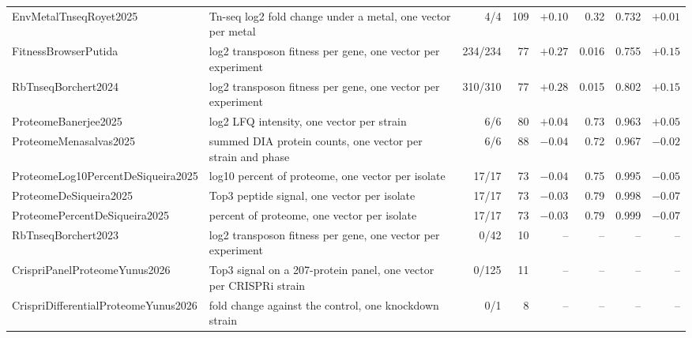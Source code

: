 \begin{longtable}{@{}L{40mm} L{54mm} r r r r r r@{}}
Env\allowbreak Metal\allowbreak Tnseq\allowbreak Royet2025 & Tn-seq log2 fold change under a metal, one vector per metal & 4/4 & 109 & $+0.10$ & 0.32 & 0.732 & $+0.01$ \\
Fitness\allowbreak Browser\allowbreak Putida & log2 transposon fitness per gene, one vector per experiment & 234/234 & 77 & $+0.27$ & 0.016 & 0.755 & $+0.15$ \\
Rb\allowbreak Tnseq\allowbreak Borchert2024 & log2 transposon fitness per gene, one vector per experiment & 310/310 & 77 & $+0.28$ & 0.015 & 0.802 & $+0.15$ \\
Proteome\allowbreak Banerjee2025 & log2 LFQ intensity, one vector per strain & 6/6 & 80 & $+0.04$ & 0.73 & 0.963 & $+0.05$ \\
Proteome\allowbreak Menasalvas2025 & summed DIA protein counts, one vector per strain and phase & 6/6 & 88 & $-0.04$ & 0.72 & 0.967 & $-0.02$ \\
Proteome\allowbreak Log10\allowbreak Percent\allowbreak De\allowbreak Siqueira2025 & log10 percent of proteome, one vector per isolate & 17/17 & 73 & $-0.04$ & 0.75 & 0.995 & $-0.05$ \\
Proteome\allowbreak De\allowbreak Siqueira2025 & Top3 peptide signal, one vector per isolate & 17/17 & 73 & $-0.03$ & 0.79 & 0.998 & $-0.07$ \\
Proteome\allowbreak Percent\allowbreak De\allowbreak Siqueira2025 & percent of proteome, one vector per isolate & 17/17 & 73 & $-0.03$ & 0.79 & 0.999 & $-0.07$ \\
Rb\allowbreak Tnseq\allowbreak Borchert2023 & log2 transposon fitness per gene, one vector per experiment & 0/42 & 10 & -- & -- & -- & -- \\
Crispri\allowbreak Panel\allowbreak Proteome\allowbreak Yunus2026 & Top3 signal on a 207-protein panel, one vector per CRISPRi strain & 0/125 & 11 & -- & -- & -- & -- \\
Crispri\allowbreak Differential\allowbreak Proteome\allowbreak Yunus2026 & fold change against the control, one knockdown strain & 0/1 & 8 & -- & -- & -- & -- \\
\end{longtable}
\endgroup

